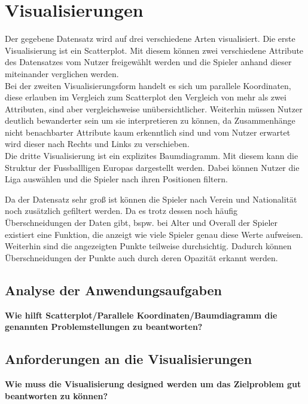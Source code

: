 \documentclass[usegeometry=true]{scrartcl}
\begin{document}
\section{Visualisierungen}
Der gegebene Datensatz wird auf drei verschiedene Arten visualisiert.
Die erste Visualisierung ist ein Scatterplot. Mit diesem können zwei verschiedene Attribute des Datensatzes vom Nutzer freigewählt werden und die Spieler anhand dieser miteinander verglichen werden.\\
Bei der zweiten Visualisierungsform handelt es sich um parallele Koordinaten, diese erlauben im Vergleich zum Scatterplot den Vergleich von mehr als zwei Attributen, sind aber vergleichsweise unübersichtlicher. Weiterhin müssen Nutzer deutlich bewanderter sein um sie interpretieren zu können, da Zusammenhänge nicht benachbarter Attribute kaum erkenntlich sind und vom Nutzer erwartet wird dieser nach Rechts und Links zu verschieben.\\
Die dritte Visualisierung ist ein explizites Baumdiagramm. Mit diesem kann die Struktur der Fussballligen Europas dargestellt werden. Dabei können Nutzer die Liga auswählen und die Spieler nach ihren Positionen filtern.


 Da der Datensatz sehr groß ist können die Spieler nach Verein und Nationalität noch zusätzlich gefiltert werden. Da es trotz dessen noch häufig Überschneidungen der Daten gibt, bspw. bei Alter und Overall der Spieler existiert eine Funktion, die anzeigt wie viele Spieler genau diese Werte aufweisen. Weiterhin sind die angezeigten Punkte teilweise durchsichtig. Dadurch können Überschneidungen der Punkte auch durch deren Opazität erkannt werden.

\subsection{Analyse der Anwendungsaufgaben}

\textbf{Wie hilft Scatterplot/Parallele Koordinaten/Baumdiagramm die genannten Problemstellungen zu beantworten?}
\subsection{Anforderungen an die Visualisierungen}
\textbf{Wie muss die Visualisierung designed werden um das Zielproblem gut beantworten zu können?}
\end{document}

